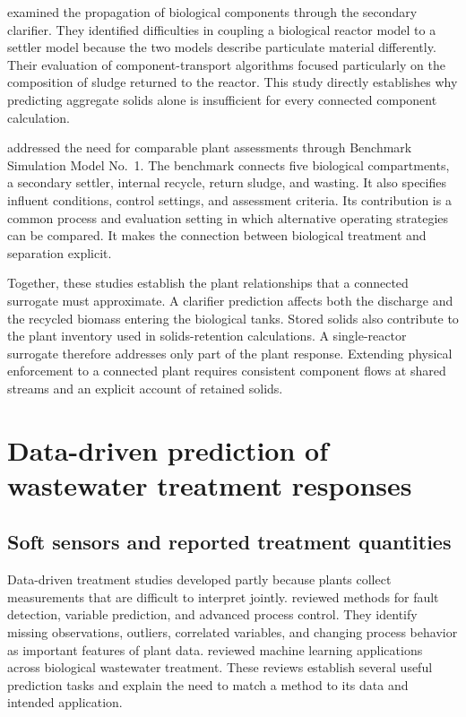 \citet{JeppssonDiehl1996} examined the propagation of biological components through the secondary clarifier. They identified difficulties in coupling a biological reactor model to a settler model because the two models describe particulate material differently. Their evaluation of component-transport algorithms focused particularly on the composition of sludge returned to the reactor. This study directly establishes why predicting aggregate solids alone is insufficient for every connected component calculation.

\citet{Alex2008} addressed the need for comparable plant assessments through Benchmark Simulation Model No.\ 1. The benchmark connects five biological compartments, a secondary settler, internal recycle, return sludge, and wasting. It also specifies influent conditions, control settings, and assessment criteria. Its contribution is a common process and evaluation setting in which alternative operating strategies can be compared. It makes the connection between biological treatment and separation explicit.

Together, these studies establish the plant relationships that a connected surrogate must approximate. A clarifier prediction affects both the discharge and the recycled biomass entering the biological tanks. Stored solids also contribute to the plant inventory used in solids-retention calculations. A single-reactor surrogate therefore addresses only part of the plant response. Extending physical enforcement to a connected plant requires consistent component flows at shared streams and an explicit account of retained solids.

\section{Data-driven prediction of wastewater treatment responses}

\subsection{Soft sensors and reported treatment quantities}

Data-driven treatment studies developed partly because plants collect measurements that are difficult to interpret jointly. \citet{Newhart2019} reviewed methods for fault detection, variable prediction, and advanced process control. They identify missing observations, outliers, correlated variables, and changing process behavior as important features of plant data. \citet{Sundui2021} reviewed machine learning applications across biological wastewater treatment. These reviews establish several useful prediction tasks and explain the need to match a method to its data and intended application.


